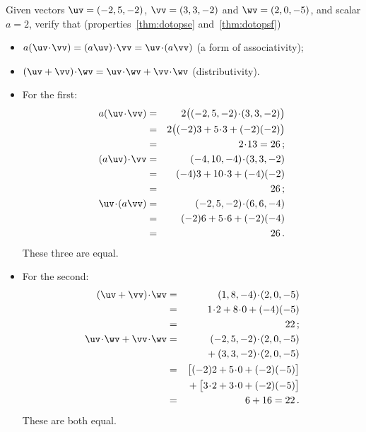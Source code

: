 \begin{example} \label{eg:}
Given vectors \(\uv=(-2,5,-2)\), \(\vv=(3,3,-2)\) and \(\wv=(2,0,-5)\), and  scalar \(a=2\), verify that (properties~\ref{thm:dotopse} and~\ref{thm:dotopsf})
\begin{itemize}
\item \(a(\uv\cdot\vv)=(a\uv)\cdot\vv=\uv\cdot(a\vv)\) (a form of associativity);
\item \((\uv+\vv)\cdot\wv=\uv\cdot\wv+\vv\cdot\wv\) (distributivity).
\end{itemize}
\begin{solution} 
\begin{itemize}
\item For the first:
\begin{eqnarray*}
a(\uv\cdot\vv)&=&2\big((-2,5,-2)\cdot(3,3,-2)\big)
\\&=&2\big((-2)3+5\cdot3+(-2)(-2)\big)
\\&=&2\cdot13=26\,;
\\(a\uv)\cdot\vv&=&(-4,10,-4)\cdot(3,3,-2)
\\&=&(-4)3+10\cdot3+(-4)(-2)
\\&=&26\,;
\\\uv\cdot(a\vv)&=&(-2,5,-2)\cdot(6,6,-4)
\\&=&(-2)6+5\cdot6+(-2)(-4)
\\&=&26\,.
\end{eqnarray*}
These three are equal.

\item For the second:
\begin{eqnarray*}
(\uv+\vv)\cdot\wv&=&(1,8,-4)\cdot(2,0,-5)
\\&=&1\cdot2+8\cdot0+(-4)(-5)
\\&=&22\,;
\\\uv\cdot\wv+\vv\cdot\wv&=&
(-2,5,-2)\cdot(2,0,-5)
\\&&{}
+(3,3,-2)\cdot(2,0,-5)
\\&=&\big[(-2)2+5\cdot0+(-2)(-5)\big]
\\&&{}
+\big[3\cdot2+3\cdot0+(-2)(-5)\big]
\\&=&6+16=22\,.
\end{eqnarray*}
These are both equal.
\end{itemize}
\end{solution}
\end{example}




